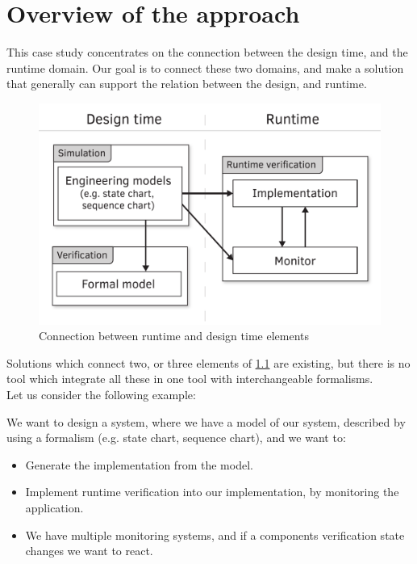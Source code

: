 \chapter{Overview of the approach}
\label{chap:overview}

This case study concentrates on the connection between the design time, and the runtime domain. Our goal is to connect these two domains, and make a solution that generally can support the relation between the design, and runtime.

\begin{figure}[h]
	\centering
	\includegraphics[width=0.75\linewidth]{include/figures/chapter_3/abstract_overview}
	\caption{Connection between runtime and design time elements}
	\label{fig:overview:abstract_overview}
\end{figure}

Solutions which connect two, or three elements of \cref{fig:overview:abstract_overview} are existing, but there is no tool which integrate all these in one tool with interchangeable formalisms.
\\[1ex]

\noindent Let us consider the following example:

We want to design a system, where we have a model of our system, described by using a formalism (e.g. state chart, sequence chart), and we want to:
\begin{itemize}
	\item Generate the implementation from the model.
	\item Implement runtime verification into our implementation, by monitoring the application.
	\item We have multiple monitoring systems, and if a components verification state changes we want to react.
\end{itemize}